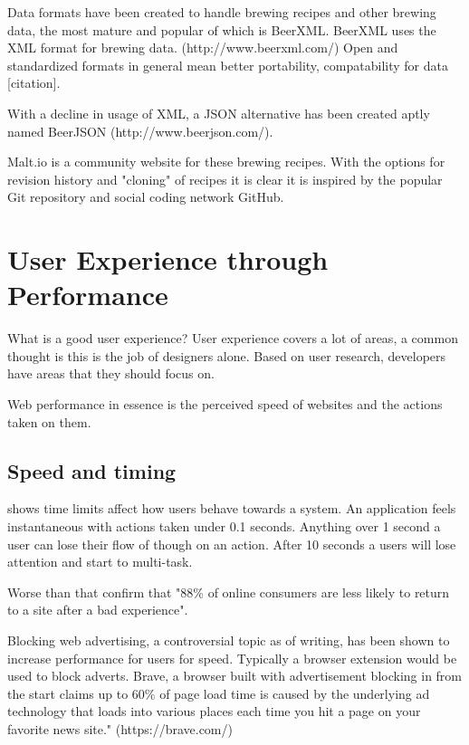 Data formats have been created to handle brewing recipes and other brewing data, the most mature and popular of which is BeerXML. BeerXML uses the XML format for brewing data. (http://www.beerxml.com/) Open and standardized formats in general mean better portability, compatability for data [citation].

With a decline in usage of XML, a JSON alternative has been created aptly named BeerJSON (http://www.beerjson.com/).

Malt.io is a community website for these brewing recipes. With the options for revision history and "cloning" of recipes it is clear it is inspired by the popular Git repository and social coding network GitHub. 


\section{User Experience through Performance} \label{l-r--user-experience-performance}

What is a good user experience? User experience covers a lot of areas, a common thought is this is the job of designers alone. Based on user research, developers have areas that they should focus on.

Web performance in essence is the perceived speed of websites and the actions taken on them.


\subsection{Speed and timing}

\cite{usability_engineering} shows time limits affect how users behave towards a system. An application feels instantaneous with actions taken under 0.1 seconds.  Anything over 1 second a user can lose their flow of though on an action. After 10 seconds a users will lose attention and start to multi-task.

Worse than that \cite{why_web_performance_matters} confirm that "88\% of online consumers are less likely to return to a site after a bad experience".

Blocking web advertising, a controversial topic as of writing, has been shown to increase performance for users for speed. Typically a browser extension would be used to block adverts. Brave, a browser built with advertisement blocking in from the start claims up to 60\% of page load time is caused by the underlying ad technology that loads into various places each time you hit a page on your favorite news site." (https://brave.com/)

